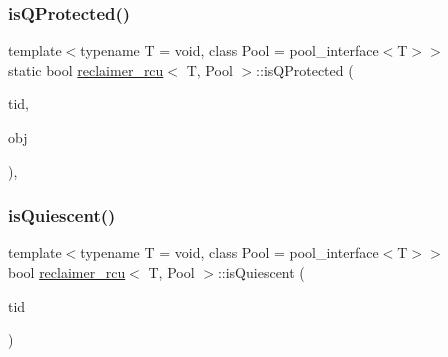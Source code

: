 \mbox{\label{classreclaimer__rcu_a64723a698dde603065e5e1c67761d15c}} 
\subsubsection{\texorpdfstring{is\+Q\+Protected()}{isQProtected()}}
{\footnotesize\ttfamily template$<$typename T  = void, class Pool  = pool\+\_\+interface$<$\+T$>$$>$ \\
static bool \hyperlink{classreclaimer__rcu}{reclaimer\+\_\+rcu}$<$ T, Pool $>$\+::is\+Q\+Protected (\begin{DoxyParamCaption}\item[{const int}]{tid,  }\item[{T $\ast$const}]{obj }\end{DoxyParamCaption})\hspace{0.3cm}{\ttfamily [inline]}, {\ttfamily [static]}}

\mbox{\label{classreclaimer__rcu_aac05d4d8bd2341860af63c0d89600d0a}} 
\subsubsection{\texorpdfstring{is\+Quiescent()}{isQuiescent()}}
{\footnotesize\ttfamily template$<$typename T  = void, class Pool  = pool\+\_\+interface$<$\+T$>$$>$ \\
bool \hyperlink{classreclaimer__rcu}{reclaimer\+\_\+rcu}$<$ T, Pool $>$\+::is\+Quiescent (\begin{DoxyParamCaption}\item[{const int}]{tid }\end{DoxyParamCaption})\hspace{0.3cm}{\ttfamily [inline]}}

\mbox{\label{classreclaimer__rcu_aef0461a44efcde0d9253fa4bd9ea5f5f}} 
